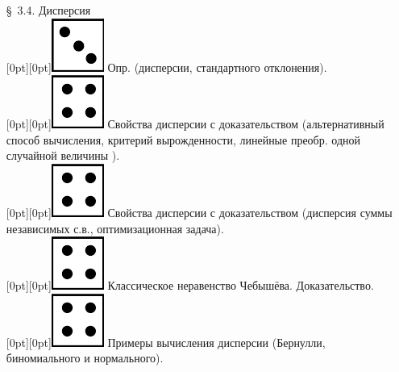 \documentclass[10pt]{amsart}
\begin{document}
\begin{enumerate}
\begin{enumerate}
\item[\S\, 3.4.] Дисперсия \\
 \raisebox{-1pt}[0pt][0pt]{\includegraphics[width=0.02\linewidth]{3.png}} Опр. (дисперсии, стандартного отклонения). \\ 
 \raisebox{-1pt}[0pt][0pt]{\includegraphics[width=0.02\linewidth]{4.png}} Свойства дисперсии с доказательством (альтернативный способ вычисления, критерий вырожденности, линейные преобр. одной случайной величины ). \\ 
 \raisebox{-1pt}[0pt][0pt]{\includegraphics[width=0.02\linewidth]{4.png}} Свойства дисперсии с доказательством (дисперсия суммы независимых с.в., оптимизационная задача). \\ 
 \raisebox{-1pt}[0pt][0pt]{\includegraphics[width=0.02\linewidth]{4.png}} Классическое неравенство Чебышёва. Доказательство. \\
 \raisebox{-1pt}[0pt][0pt]{\includegraphics[width=0.02\linewidth]{4.png}} Примеры вычисления дисперсии (Бернулли, биномиального и нормального). \\
 
        
        

\end{enumerate}
\end{enumerate}
\end{document}
